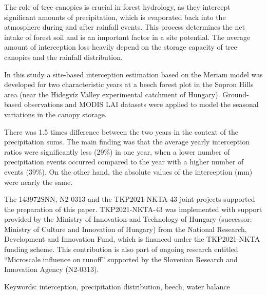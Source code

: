 \noindent

The role of tree canopies is crucial in forest hydrology, as they intercept significant amounts of precipitation, which is evaporated back into the atmosphere during and after rainfall events. This process determines the net intake of forest soil and is an important factor in a site potential. The average amount of interception loss heavily depend on the storage capacity of tree canopies and the rainfall distribution.

In this study a site-based interception estimation based on the Meriam model was developed for two characteristic years at a beech forest plot in the Sopron Hills area (near the Hidegvíz Valley experimental catchment of Hungary). Ground-based observations and MODIS LAI datasets were applied to model the seasonal variations in the canopy storage. 

There was 1.5 times difference between the two years in the context of the precipitation sums. The main finding was that the average yearly interception ratios were significantly less (29\%) in one year, when a lower number of precipitation events occurred compared to the year with a higher number of events (39\%). On the other hand, the absolute values of the interception (mm) were nearly the same.

The 143972SNN, N2-0313 and the TKP2021-NKTA-43 joint projects supported the preparation of this paper. TKP2021-NKTA-43 was implemented with support provided by the Ministry of Innovation and Technology of Hungary (successor: Ministry of Culture and Innovation of Hungary) from the National Research, Development and Innovation Fund, which is financed under the TKP2021-NKTA funding scheme. This contribution is also part of ongoing research entitled “Microscale influence on runoff” supported by the Slovenian Research and Innovation Agency (N2-0313).

Keywords: interception, precipitation distribution, beech, water balance





